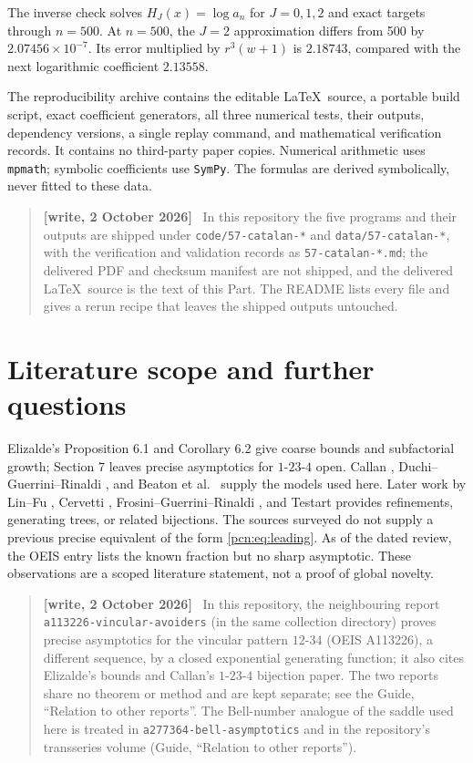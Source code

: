 \documentclass[11pt,letterpaper]{article}
\theoremstyle{remark}\newtheorem{remark}[theorem]{Remark}
\newenvironment{writenote}{\par\smallskip\begin{quote}\small\textbf{[write, 2 October 2026]}\ }{\end{quote}\smallskip}
\newcommand{\repopath}[1]{\nolinkurl{#1}}
\begin{document}
The inverse check solves $H_J(x)=\log a_n$ for $J=0,1,2$ and exact targets through $n=500$. At $n=500$, the $J=2$ approximation differs from 500 by $2.07456\times10^{-7}$. Its error multiplied by $r^3(w+1)$ is $2.18743$, compared with the next logarithmic coefficient $2.13558$.

The reproducibility archive contains the editable \LaTeX\ source, a portable build script, exact coefficient generators, all three numerical tests, their outputs, dependency versions, a single replay command, and mathematical verification records. It contains no third-party paper copies. Numerical arithmetic uses \texttt{mpmath}; symbolic coefficients use \texttt{SymPy}. The formulas are derived symbolically, never fitted to these data.
\begin{writenote}
In this repository the five programs and their outputs are shipped under \texttt{code/57-catalan-*} and \texttt{data/57-catalan-*}, with the verification and validation records as \texttt{57-catalan-*.md}; the delivered PDF and checksum manifest are not shipped, and the delivered \LaTeX\ source is the text of this Part. The README lists every file and gives a rerun recipe that leaves the shipped outputs untouched.
\end{writenote}

\section{Literature scope and further questions}\label{pcn:sec:literature}
Elizalde's Proposition 6.1 and Corollary 6.2 \cite{Elizalde} give coarse bounds and subfactorial growth; Section 7 leaves precise asymptotics for $1$-$23$-$4$ open. Callan \cite{Callan}, Duchi--Guerrini--Rinaldi \cite{Duchi}, and Beaton et al.\ \cite{Beaton} supply the models used here. Later work by Lin--Fu \cite{LinFu}, Cervetti \cite{Cervetti}, Frosini--Guerrini--Rinaldi \cite{Frosini}, and Testart \cite{Testart} provides refinements, generating trees, or related bijections. The sources surveyed do not supply a previous precise equivalent of the form \eqref{pcn:eq:leading}. As of the dated review, the OEIS entry lists the known fraction but no sharp asymptotic. These observations are a scoped literature statement, not a proof of global novelty.
\begin{writenote}
In this repository, the neighbouring report \repopath{a113226-vincular-avoiders} (in the same collection directory) proves precise asymptotics for the vincular pattern $12$-$34$ (OEIS A113226), a different sequence, by a closed exponential generating function; it also cites Elizalde's bounds and Callan's $1$-$23$-$4$ bijection paper. The two reports share no theorem or method and are kept separate; see the Guide, ``Relation to other reports''. The Bell-number analogue of the saddle used here is treated in \repopath{a277364-bell-asymptotics} and in the repository's transseries volume (Guide, ``Relation to other reports'').
\end{writenote}
\end{document}
